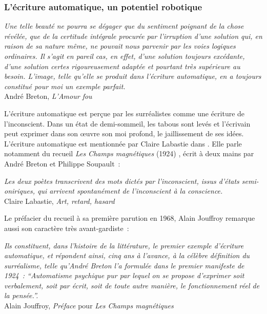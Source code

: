 \documentclass{article}
\newenvironment{citationbox}
{\begin{center}
		\begin{minipage}{.8\textwidth}
		}
		{
		\end{minipage}	
\end{center}
}
\begin{document}
			\subsubsection{L'écriture automatique, un potentiel robotique}\label{ecriture_auto}
				\begin{citationbox}
					\textit{Une telle beauté ne pourra se dégager que du sentiment poignant de la chose révélée, que de la certitude intégrale procurée par l'irruption d'une solution qui, en raison de sa nature même, ne pouvait nous parvenir par les voies logiques ordinaires. Il s'agit en pareil cas, en effet, d'une solution toujours excédante, d'une solution certes rigoureusement adaptée et pourtant très supérieure au besoin. L'image, telle qu'elle se produit dans l'écriture automatique, en a toujours constitué pour moi un exemple parfait.}\\
					André Breton, \textit{L'Amour fou}\cite{breton1937}
				\end{citationbox}
				L'écriture automatique est perçue par les surréalistes comme une écriture de l'inconscient. Dans un état de demi-sommeil, les tabous sont levés et l'écrivain peut exprimer dans son œuvre son moi profond, le jaillissement de ses idées. L'écriture automatique est mentionnée par Claire Labastie dans \cite{labastie2016}. Elle parle notamment du recueil \textit{Les Champs magnétiques} (1924) \cite{breton1937}, écrit à deux mains par André Breton et Philippe Soupault~:\\
				\begin{citationbox}
					\textit{Les deux poètes
					transcrivent des mots dictés par l'inconscient, issus d'états semi-oniriques, qui arrivent
					spontanément de l'inconscient à la conscience.}\\
					Claire Labastie, \textit{Art, retard, hasard}\cite{labastie2016}
				\end{citationbox}
				Le préfacier du recueil à sa première parution en 1968, Alain Jouffroy remarque aussi son caractère très avant-gardiste~:
				\begin{citationbox}
					\textit{Ils constituent, dans
					l’histoire de la littérature, le premier exemple d’écriture automatique, et
					répondent ainsi, cinq ans à l’avance, à la célèbre définition du
					surréalisme, telle qu’André Breton l’a formulée dans le premier
					manifeste de 1924~: ``Automatisme psychique pur par lequel on se
					propose d’exprimer soit verbalement, soit par écrit, soit de toute autre
					manière, le fonctionnement réel de la pensée.''.}\\
					Alain Jouffroy, \textit{Préface} pour \textit{Les Champs magnétiques}\cite{breton1968}
				\end{citationbox}
				
\end{document}
